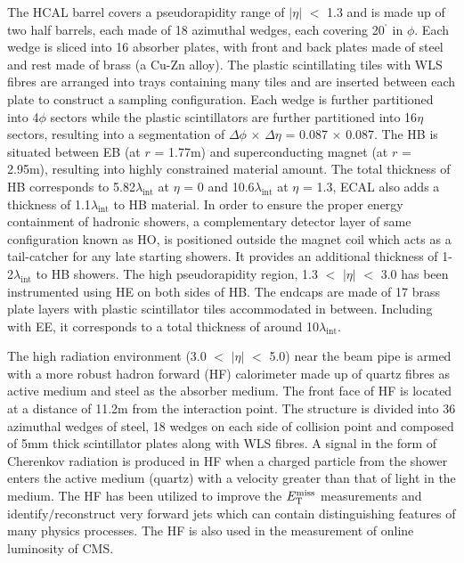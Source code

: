The HCAL barrel covers a pseudorapidity range of $|\eta|$ $<$ 1.3 and is made up of two half barrels, each made of 18 azimuthal wedges,
each covering 20$^{^{\circ}}$ in $\phi$. Each wedge is sliced into 16 absorber plates, with front and back plates made of
steel and rest made of brass (a Cu-Zn alloy). The plastic scintillating tiles with WLS fibres are arranged into trays containing many tiles and
are inserted between each plate to construct a sampling configuration. Each wedge is further partitioned into 4$\phi$ sectors while
the plastic scintillators are further partitioned into 16$\eta$ sectors, resulting into a segmentation of $\Delta\phi$ $\times$ $\Delta\eta$ = 0.087 $\times$ 0.087.
The HB is situated between EB (at $r$ = 1.77\unit{m}) and superconducting magnet (at $r$ = 2.95\unit{m}), resulting into highly constrained material amount.
The total thickness of HB corresponds to 5.82$\lambda_{\textrm{int}}$ at $\eta$ = 0 and 10.6$\lambda_{\textrm{int}}$ at $\eta$ = 1.3, ECAL also adds a thickness of
1.1$\lambda_{\textrm{int}}$ to HB material. In order to ensure the proper energy containment of hadronic showers, a complementary detector layer of same
configuration known as HO, is positioned outside the magnet coil which acts as a tail-catcher for any late starting showers.
It provides an additional thickness of 1-2$\lambda_{\textrm{int}}$ to HB showers. The high pseudorapidity region, 1.3 $<$ $|\eta|$ $<$ 3.0 has been
instrumented using HE on both sides of HB. The endcaps are made of 17 brass plate layers with plastic scintillator tiles accommodated in between. Including with EE,
it corresponds to a total thickness of around 10$\lambda_{\textrm{int}}$.

The high radiation environment (3.0 $<$ $|\eta|$ $<$ 5.0) near the beam pipe is armed with a more robust hadron forward (HF) calorimeter made up of quartz fibres
as active medium and steel as the absorber medium. The front face of HF is located at a distance of 11.2\unit{m} from the interaction point. The structure is
divided into 36 azimuthal wedges of steel, 18 wedges on each side of collision point and composed of 5\unit{mm} thick scintillator plates along with WLS fibres.     
A signal in the form of Cherenkov radiation is produced in HF when a charged particle from the shower enters the active medium (quartz)
with a velocity greater than that of light in the medium. The HF has been utilized
to improve the $E_{\mathrm{T}}^{\text{miss}}$ measurements and identify$/$reconstruct very forward jets which can contain distinguishing features of many physics processes.
The HF is also used in the measurement of online luminosity of CMS.

